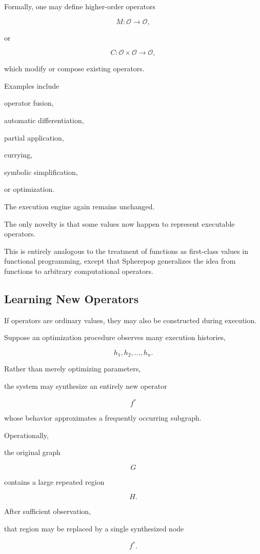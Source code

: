\documentclass[12pt,oneside]{article}
\begin{document}
Formally, one may define higher-order operators

\[
M:\mathcal O\rightarrow\mathcal O,
\]

or

\[
C:\mathcal O\times\mathcal O\rightarrow\mathcal O,
\]

which modify or compose existing operators.

Examples include

operator fusion,

automatic differentiation,

partial application,

currying,

symbolic simplification,

or optimization.

The execution engine again remains unchanged.

The only novelty is that some values now happen to represent executable operators.

This is entirely analogous to the treatment of functions as first-class values in functional programming, except that Spherepop generalizes the idea from functions to arbitrary computational operators.

\subsection{Learning New Operators}

If operators are ordinary values, they may also be constructed during execution.

Suppose an optimization procedure observes many execution histories,

\[
h_1,h_2,\ldots,h_n.
\]

Rather than merely optimizing parameters,

the system may synthesize an entirely new operator

\[
f^\ast
\]

whose behavior approximates a frequently occurring subgraph.

Operationally,

the original graph

\[
G
\]

contains a large repeated region

\[
H.
\]

After sufficient observation,

that region may be replaced by a single synthesized node

\[
f^\ast.
\]
\end{document}
